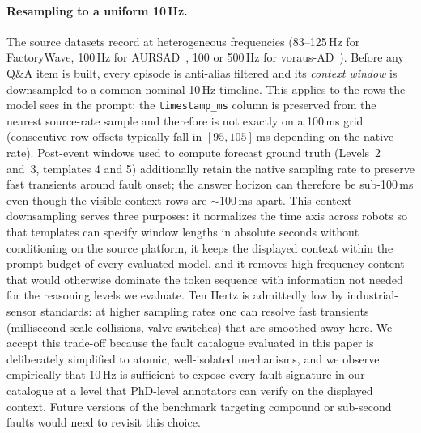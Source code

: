 \paragraph{Resampling to a uniform 10\,Hz.} The source datasets record at heterogeneous frequencies (83--125\,Hz for FactoryWave, 100\,Hz for AURSAD~\cite{leporowski2022aursad}, 100 or 500\,Hz for voraus-AD~\cite{brockmann2023vorausad}). Before any Q\&A item is built, every episode is anti-alias filtered and its \emph{context window} is downsampled to a common nominal 10\,Hz timeline. This applies to the rows the model sees in the prompt; the \texttt{timestamp\_ms} column is preserved from the nearest source-rate sample and therefore is not exactly on a 100\,ms grid (consecutive row offsets typically fall in $[95, 105]$\,ms depending on the native rate). Post-event windows used to compute forecast ground truth (Levels~2 and~3, templates 4 and 5) additionally retain the native sampling rate to preserve fast transients around fault onset; the answer horizon can therefore be sub-100\,ms even though the visible context rows are $\sim$100\,ms apart. This context-downsampling serves three purposes: it normalizes the time axis across robots so that templates can specify window lengths in absolute seconds without conditioning on the source platform, it keeps the displayed context within the prompt budget of every evaluated model, and it removes high-frequency content that would otherwise dominate the token sequence with information not needed for the reasoning levels we evaluate. Ten Hertz is admittedly low by industrial-sensor standards: at higher sampling rates one can resolve fast transients (millisecond-scale collisions, valve switches) that are smoothed away here. We accept this trade-off because the fault catalogue evaluated in this paper is deliberately simplified to atomic, well-isolated mechanisms, and we observe empirically that 10\,Hz is sufficient to expose every fault signature in our catalogue at a level that PhD-level annotators can verify on the displayed context. Future versions of the benchmark targeting compound or sub-second faults would need to revisit this choice.

